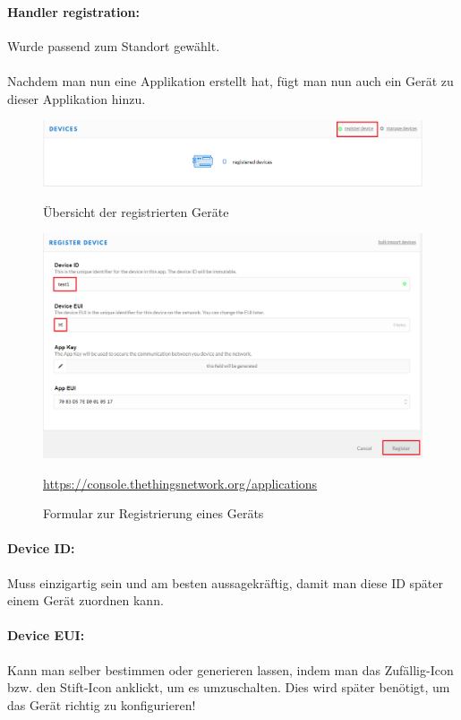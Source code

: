 \paragraph{Handler registration:} Wurde passend zum Standort gewählt.\\
\\
Nachdem man nun eine Applikation erstellt hat, fügt man nun auch ein Gerät zu dieser Applikation hinzu.
\begin{figure}[ht]
    \center
    \includegraphics[width=16cm]{Bilder/lora-4.png}\\
    \caption{Übersicht der registrierten Geräte}
\end{figure}
\begin{figure}[ht]
    \center
    \includegraphics[width=16cm]{Bilder/lora-5.png}\\
    \caption{Formular zur Registrierung eines Geräts}
    \begin{center} \quelle\url{https://console.thethingsnetwork.org/applications} \end{center}
\end{figure}
\newpage
\paragraph{Device ID:} Muss einzigartig sein und am besten aussagekräftig, damit man diese ID später einem Gerät zuordnen kann.

\paragraph{Device EUI:} Kann man selber bestimmen oder generieren lassen, indem man das Zufällig-Icon bzw. den Stift-Icon anklickt, um es umzuschalten. Dies wird später benötigt, um das Gerät richtig zu konfigurieren!

